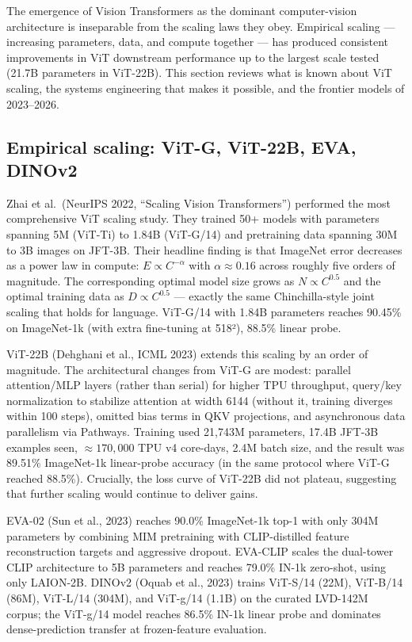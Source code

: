 The emergence of Vision Transformers as the dominant computer-vision architecture is inseparable from the scaling laws they obey. Empirical scaling --- increasing parameters, data, and compute together --- has produced consistent improvements in ViT downstream performance up to the largest scale tested (21.7B parameters in ViT-22B). This section reviews what is known about ViT scaling, the systems engineering that makes it possible, and the frontier models of 2023--2026.

\subsection{Empirical scaling: ViT-G, ViT-22B, EVA, DINOv2}\label{empirical-scaling-vit-g-vit-22b-eva-dinov2}

Zhai et al.~(NeurIPS 2022, ``Scaling Vision Transformers'') performed the most comprehensive ViT scaling study. They trained 50+ models with parameters spanning 5M (ViT-Ti) to 1.84B (ViT-G/14) and pretraining data spanning 30M to 3B images on JFT-3B. Their headline finding is that ImageNet error decreases as a power law in compute: \(E \propto C^{-\alpha}\) with \(\alpha \approx 0.16\) across roughly five orders of magnitude. The corresponding optimal model size grows as \(N \propto C^{0.5}\) and the optimal training data as \(D \propto C^{0.5}\) --- exactly the same Chinchilla-style joint scaling that holds for language. ViT-G/14 with 1.84B parameters reaches 90.45\% on ImageNet-1k (with extra fine-tuning at 518²), 88.5\% linear probe.

ViT-22B (Dehghani et al., ICML 2023) extends this scaling by an order of magnitude. The architectural changes from ViT-G are modest: parallel attention/MLP layers (rather than serial) for higher TPU throughput, query/key normalization to stabilize attention at width 6144 (without it, training diverges within 100 steps), omitted bias terms in QKV projections, and asynchronous data parallelism via Pathways. Training used 21,743M parameters, 17.4B JFT-3B examples seen, \(\approx 170{,}000\) TPU v4 core-days, 2.4M batch size, and the result was 89.51\% ImageNet-1k linear-probe accuracy (in the same protocol where ViT-G reached 88.5\%). Crucially, the loss curve of ViT-22B did not plateau, suggesting that further scaling would continue to deliver gains.

EVA-02 (Sun et al., 2023) reaches 90.0\% ImageNet-1k top-1 with only 304M parameters by combining MIM pretraining with CLIP-distilled feature reconstruction targets and aggressive dropout. EVA-CLIP scales the dual-tower CLIP architecture to 5B parameters and reaches 79.0\% IN-1k zero-shot, using only LAION-2B. DINOv2 (Oquab et al., 2023) trains ViT-S/14 (22M), ViT-B/14 (86M), ViT-L/14 (304M), and ViT-g/14 (1.1B) on the curated LVD-142M corpus; the ViT-g/14 model reaches 86.5\% IN-1k linear probe and dominates dense-prediction transfer at frozen-feature evaluation.


